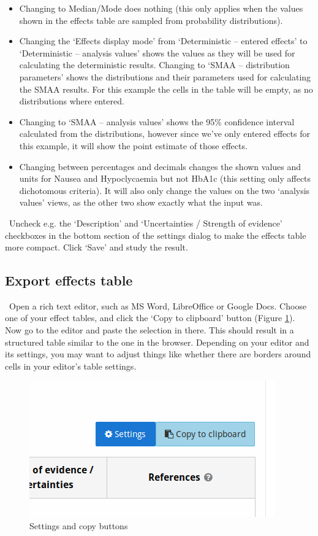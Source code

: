 \documentclass[00_mcda_tutorial.tex]{subfiles}
\begin{document}
\begin{itemize}
\item Changing to Median/Mode does nothing (this only applies when the values shown in the effects table are sampled from probability distributions).
\item Changing the ‘Effects display mode’ from ‘Deterministic – entered effects’ to ‘Deterministic – analysis values’ shows the values as they will be used for calculating the deterministic results. 
Changing to ‘SMAA – distribution parameters’ shows the distributions and their parameters used for calculating the SMAA results. For this example the cells in the table will be empty, as no distributions where entered.
\item Changing to ‘SMAA – analysis values’ shows the 95\% confidence interval calculated from the distributions, however since we’ve only entered effects for this example, it will show the point estimate of those effects.
\item Changing between percentages and decimals changes the shown values and units for Nausea and Hypoclycaemia but not HbA1c (this setting only affects dichotomous criteria). It will also only change the values on the two ‘analysis values’ views, as the other two show exactly what the input was.
\end{itemize}

\noindent \leftpointright \, Uncheck e.g. the ‘Description’ and ‘Uncertainties / Strength of evidence’ checkboxes in the bottom section of the settings dialog to make the effects table more compact. Click ‘Save’ and study the result.

\subsection*{Export effects table}
\noindent \leftpointright \, Open a rich text editor, such as MS Word, LibreOffice or Google Docs. Choose one of your effect tables, and click the ‘Copy to clipboard’ button (Figure \ref{fig:clipboard_button}). Now go to the editor and paste the selection in there. This should result in a structured table similar to the one in the browser. Depending on your editor and its settings, you may want to adjust things like whether there are borders around cells in your editor’s table settings.

\begin{figure}[!h]
    \centering
	\includegraphics[width=.5\textwidth]{fig/clipboardButton.png}
    \caption{Settings and copy buttons}
	\label{fig:clipboard_button}
\end{figure}
\end{document}
